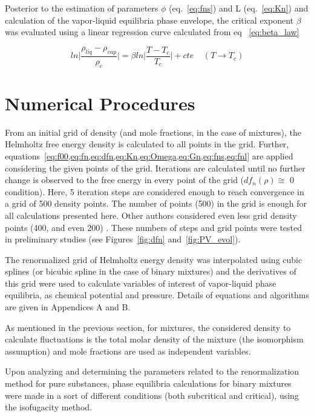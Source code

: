 \documentclass[preprint,12pt,3p]{elsarticle}
\begin{document}
    Posterior to the estimation of parameters $\phi$ (eq.~\ref{eq:fns}) and L (eq.~\ref{eq:Kn}) and calculation of the vapor-liquid equilibria phase envelope, the critical exponent $\beta$ was evaluated using a linear regression curve calculated from eq ~\ref{eq:beta_law}

\begin{equation} \label{eq:beta_law}
    ln\Bigg|\frac{\rho_{liq}-\rho_{vap}}{\rho_{c}}\Bigg| = \beta ln\Bigg|\frac{T-T_{c}}{T_{c}}\Bigg|+cte \ \ \ \ \ (T \rightarrow T_{c})
\end{equation}

\section{Numerical Procedures}
    From an initial grid of density (and mole fractions, in the case of mixtures), the Helmholtz free energy density is calculated to all points in the grid. Further, equations~\cref{eq:f00,eq:fn,eq:dfn,eq:Kn,eq:Omega,eq:Gn,eq:fns,eq:fnl} are applied considering the given points of the grid. Iterations are calculated until no further change is observed to the free energy in every point of the grid ($df_{n}(\rho) \cong$ 0 condition). Here, 5 iteration steps are considered enough to reach convergence in a grid of 500 density points. The number of points (500) in the grid is enough for all calculations presented here. Other authors considered even less grid density points (400, and even 200) \cite{cai2004thermodynamics}. These numbers of steps and grid points were tested in preliminary studies (see Figures~\ref{fig:dfn} and~\ref{fig:PV_evol}).

    The renormalized grid of Helmholtz energy density was interpolated using cubic splines (or bicubic spline in the case of binary mixtures) and the derivatives of this grid were used to calculate variables of interest of vapor-liquid phase equilibria, as chemical potential and pressure. Details of equations and algorithms are given in Appendices A and B.

    As mentioned in the previous section, for mixtures, the considered density to calculate fluctuations is the total molar density of the mixture (the isomorphism assumption) and mole fractions are used as independent variables.

    Upon analyzing and determining the parameters related to the renormalization method for pure substances, phase equilibria calculations for binary mixtures were made in a sort of different conditions (both subcritical and critical), using the isofugacity method.
    
\end{document}
